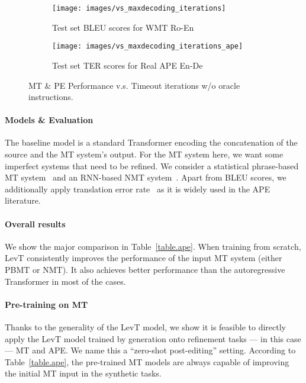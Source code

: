 \documentclass{article}
\begin{document}
\begin{figure}[t]
    \centering
    \begin{subfigure}[b]{0.4\textwidth}
    \texttt{[image: images/vs\_maxdecoding\_iterations]}
    \caption{Test set BLEU scores for WMT Ro-En}
    \end{subfigure}
    \hspace{0.12\textwidth}
    \begin{subfigure}[b]{0.4\textwidth}
    \texttt{[image: images/vs\_maxdecoding\_iterations\_ape]}
    \caption{Test set TER scores for Real APE En-De}
    \end{subfigure}
    \caption{\label{fig.oracle} MT \& PE Performance v.s. Timeout iterations w/o oracle instructions.}
\end{figure}
\paragraph{Models \& Evaluation} 
The baseline model is a standard Transformer encoding the concatenation of the source and the MT system's output.
For the MT system here, we want some imperfect systems that need to be refined. 
We consider a statistical phrase-based MT system~\citep[PBMT,][]{koehn2003statistical} 
and an RNN-based NMT system~\citep{bahdanau2014neural}.
Apart from BLEU scores, we additionally apply translation error rate~\citep[TER,][]{snover2006study} as it is widely used in the APE literature.







\paragraph{Overall results}
We show the major comparison in Table~\ref{table.ape}. When training from scratch, LevT consistently improves the performance of the input MT system (either PBMT or NMT). It also achieves better performance than the autoregressive Transformer in most of the cases.
\paragraph{Pre-training on MT}
Thanks to the generality of the LevT model, we show it is feasible to directly apply the LevT model trained by generation onto refinement tasks --- in this case --- MT and APE. 
We name this a ``zero-shot post-editing'' setting.
According to Table~\ref{table.ape}, the pre-trained MT models are always capable of improving the initial MT input in the synthetic tasks.
\end{document}
